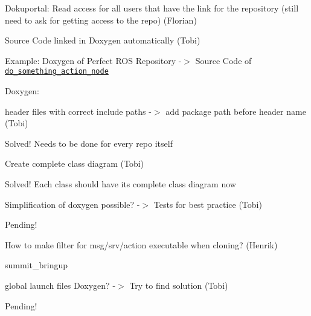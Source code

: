 \begin{DoxyEnumerate}
\item Dokuportal\+: Read access for all users that have the link for the repository (still need to ask for getting access to the repo) (Florian)
\begin{DoxyItemize}
\item Source Code linked in Doxygen automatically (Tobi)
\item Example\+: Doxygen of Perfect R\+OS Repository -\/$>$ Source Code of \href{http://coar.pages.igm.rwth-aachen.de/perfect_ros_repository/do__something__action__node_8cpp_source.html}{\tt do\+\_\+something\+\_\+action\+\_\+node}
\end{DoxyItemize}
\end{DoxyEnumerate}
\begin{DoxyEnumerate}
\item Doxygen\+:
\begin{DoxyEnumerate}
\item header files with correct include paths -\/$>$ add package path before header name (Tobi)
\begin{DoxyItemize}
\item Solved! Needs to be done for every repo itself
\end{DoxyItemize}
\end{DoxyEnumerate}
\begin{DoxyEnumerate}
\item Create complete class diagram (Tobi)
\begin{DoxyItemize}
\item Solved! Each class should have its complete class diagram now
\end{DoxyItemize}
\end{DoxyEnumerate}
\begin{DoxyEnumerate}
\item Simplification of doxygen possible? -\/$>$ Tests for best practice (Tobi)
\begin{DoxyItemize}
\item Pending!
\end{DoxyItemize}
\end{DoxyEnumerate}
\begin{DoxyEnumerate}
\item How to make filter for msg/srv/action executable when cloning? (Henrik)
\end{DoxyEnumerate}
\end{DoxyEnumerate}
\begin{DoxyEnumerate}
\item summit\+\_\+bringup
\begin{DoxyItemize}
\item global launch files Doxygen? -\/$>$ Try to find solution (Tobi)
\item Pending!
\end{DoxyItemize}
\end{DoxyEnumerate}
